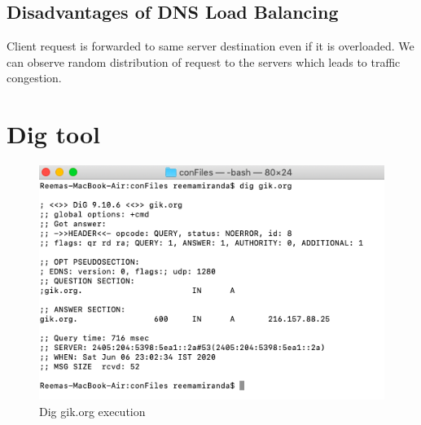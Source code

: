 \subsection{Disadvantages of DNS Load Balancing}
Client request is forwarded to same server destination even if it is overloaded.
We can observe random distribution of request to the servers which leads to traffic congestion.
\section{Dig tool}
\begin{figure}[H]
\centering
  \includegraphics[width=1.3\textwidth]{Images/Dig.png}
  \caption{Dig gik.org execution}
  \label{fig:2.15}
\end{figure}



 